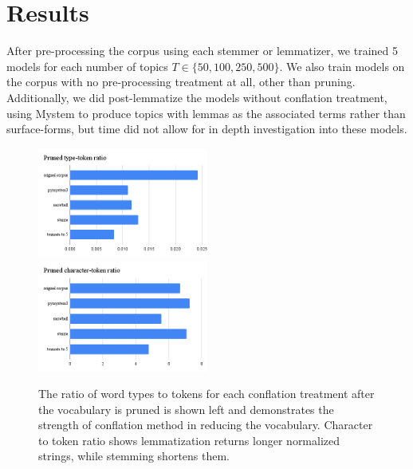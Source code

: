 \documentclass[11pt,a4paper]{article}
\begin{document}
\section{Results}
After pre-processing the corpus using each stemmer or lemmatizer, we trained 5 models for each number of topics $T\in \{50, 100, 250, 500\}$. We also train models on the corpus with no pre-processing treatment at all, other than pruning. Additionally, we did post-lemmatize the models without conflation treatment, using Mystem to produce topics with lemmas as the associated terms rather than surface-forms, but time did not allow for in depth investigation into these models.

\begin{figure}[t]
    \includegraphics[width=0.5\textwidth]{pruned_type_token_ratio.png}
    \includegraphics[width=0.5\textwidth]{pruned_character_token_ratio.png}
    \caption{The ratio of word types to tokens for each conflation treatment after the vocabulary is pruned is shown left and demonstrates the strength of conflation method in reducing the vocabulary. Character to token ratio shows lemmatization returns longer normalized strings, while stemming shortens them.}
    \label{fig:conflation_merics}
\end{figure}
\end{document}
